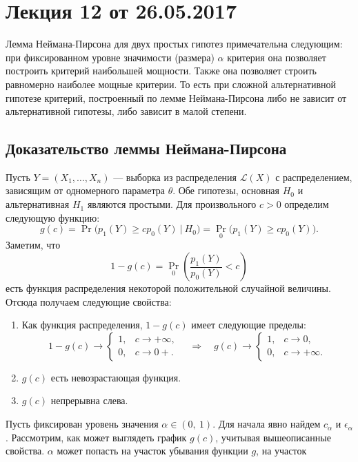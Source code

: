 \section{Лекция 12 от 26.05.2017}
Лемма Неймана-Пирсона для двух простых гипотез примечательна следующим:
при фиксированном уровне значимости (размера) $\alpha$ критерия она
позволяет построить критерий наибольшей мощности. Также она позволяет
строить равномерно наиболее мощные критерии. То есть при сложной
альтернативной гипотезе критерий, построенный по лемме Неймана-Пирсона
либо не зависит от альтернативной гипотезы, либо зависит в малой
степени.
\subsection{Доказательство леммы Неймана-Пирсона}
Пусть $Y = (X_1, \ldots, X_n)$ --- выборка из распределения 
$\mathcal{L}(X)$ с распределением, зависящим от одномерного параметра
$\theta$. Обе гипотезы, основная $H_0$ и альтернативная $H_1$ являются
простыми. Для произвольного $c > 0$ определим следующую функцию:
\[
    g(c) = \Pr\big(p_1(Y) \geqslant c p_0(Y)\ |\ H_0\big) =
    \Pr_0\big(p_1(Y) \geqslant c p_0(Y)\big).
    \]
Заметим, что
\[
    1 - g(c) = \Pr_0\left( \frac{p_1(Y)}{p_0(Y)} < c \right)
    \]
есть функция распределения некоторой положительной случайной величины.
Отсюда получаем следующие свойства:
\begin{enumerate}
    \item Как функция распределения, $1 - g(c)$ имеет следующие
        пределы:
        \[
            1 - g(c) \to
            \begin{cases}
                1, & c \to +\infty,\\
                0, & c \to 0+.
            \end{cases}
            \quad \Longrightarrow \quad
            g(c) \to
            \begin{cases}
                1, & c \to 0,\\
                0, & c \to +\infty.
            \end{cases}
            \]
    \item $g(c)$ есть невозрастающая функция.
    \item $g(c)$ непрерывна слева.
\end{enumerate}
Пусть фиксирован уровень значения $\alpha \in (0,\ 1)$. Для начала
явно найдем $c_\alpha$ и $\epsilon_\alpha$. Рассмотрим, как может
выглядеть график $g(c)$, учитывая вышеописанные свойства. $\alpha$
может попасть на участок убывания функции $g$, на участок
